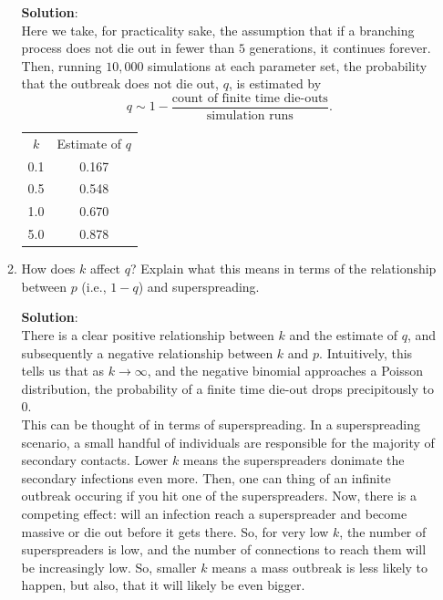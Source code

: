 \documentclass[11pt]{article}
\begin{document}
\begin{enumerate}
\begin{enumerate}[label=\alph*.]
	\begin{tcolorbox}[breakable]
		\textbf{Solution}:\\
		Here we take, for practicality sake, the assumption that if a branching process does not die out in fewer than $5$ generations, it continues forever. Then, running $10,000$ simulations at each parameter set, the probability that the outbreak does not die out, $q$, is estimated by 
		\begin{equation*}
			q \sim 1 - \frac{\text{count of finite time die-outs}}{\text{simulation runs}}.
		\end{equation*}
		\begin{center}
			\begin{tabular}{|c | c|}
				$k$ & Estimate of $q$\\
				0.1&0.167\\
				0.5&0.548\\
				1.0&0.670\\
				5.0&0.878\\
			\end{tabular}
		\end{center}
		
	\end{tcolorbox}
	
	\item How does $k$ affect $q$? Explain what this means in terms of the relationship between $p$ (i.e., $1-q$) and superspreading. 
	
	\begin{tcolorbox}[breakable]
		\textbf{Solution}:\\
		There is a clear positive relationship between $k$ and the estimate of $q$, and subsequently a negative relationship between $k$ and $p$. Intuitively, this tells us that as $k\rightarrow \infty$, and the negative binomial approaches a Poisson distribution, the probability of a finite time die-out drops precipitously to $0$.\\
		This can be thought of in terms of superspreading. In a superspreading scenario, a small handful of individuals are responsible for the majority of secondary contacts. Lower $k$ means the superspreaders donimate the secondary infections even more. Then, one can thing of an infinite outbreak occuring if you hit one of the superspreaders. Now, there is a competing effect: will an infection reach a superspreader and become massive or die out before it gets there. So, for very low $k$, the number of superspreaders is low, and the number of connections to reach them will be increasingly low. So, smaller $k$ means a mass outbreak is less likely to happen, but also, that it will likely be even bigger.
		

\end{tcolorbox}
\end{enumerate}
\end{enumerate}
\end{document}
